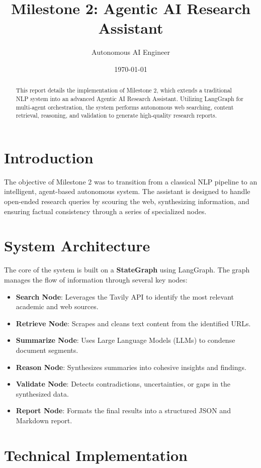 \documentclass[12pt]{article}
\title{\textbf{Milestone 2: Agentic AI Research Assistant}}
\author{Autonomous AI Engineer}
\date{\today}
\begin{document}
\maketitle

\begin{abstract}
This report details the implementation of Milestone 2, which extends a traditional NLP system into an advanced Agentic AI Research Assistant. Utilizing LangGraph for multi-agent orchestration, the system performs autonomous web searching, content retrieval, reasoning, and validation to generate high-quality research reports.
\end{abstract}

\section{Introduction}
The objective of Milestone 2 was to transition from a classical NLP pipeline to an intelligent, agent-based autonomous system. The assistant is designed to handle open-ended research queries by scouring the web, synthesizing information, and ensuring factual consistency through a series of specialized nodes.

\section{System Architecture}
The core of the system is built on a \textbf{StateGraph} using LangGraph. The graph manages the flow of information through several key nodes:

\begin{itemize}
    \item \textbf{Search Node}: Leverages the Tavily API to identify the most relevant academic and web sources.
    \item \textbf{Retrieve Node}: Scrapes and cleans text content from the identified URLs.
    \item \textbf{Summarize Node}: Uses Large Language Models (LLMs) to condense document segments.
    \item \textbf{Reason Node}: Synthesizes summaries into cohesive insights and findings.
    \item \textbf{Validate Node}: Detects contradictions, uncertainties, or gaps in the synthesized data.
    \item \textbf{Report Node}: Formats the final results into a structured JSON and Markdown report.
\end{itemize}

\section{Technical Implementation}
\end{document}
